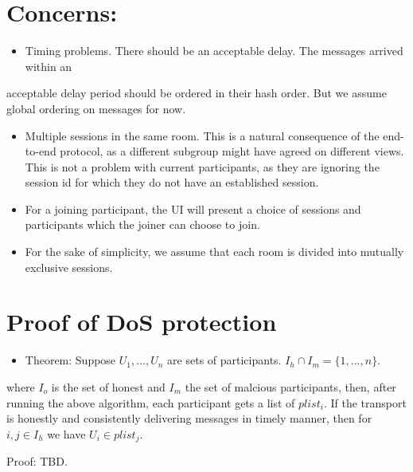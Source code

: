 \documentclass[11pt]{article}
\begin{document}
\section{Concerns:}
\label{sec-6}
\begin{itemize}
\item Timing problems. There should be an acceptable delay. The messages arrived within an
\end{itemize}
acceptable delay period should be ordered in their hash order. But we 
assume global ordering on messages for now.

\begin{itemize}
\item Multiple sessions in the same room. This is a natural consequence of the end-to-end protocol, as a different subgroup might have agreed on different views. This is not a problem with current participants, as they are ignoring the session id for which they do not have an established session.
\item For a joining participant, the UI will present a choice of sessions and participants which the joiner can choose to join.
\item For the sake of simplicity, we assume that each room is divided into mutually exclusive sessions.
\end{itemize}

\section{Proof of DoS protection}
\label{sec-7}
\begin{itemize}
\item Theorem: Suppose $U_1,...,U_n$ are sets of participants. $I_h \cap I_m = \{1,...,n\}$.
\end{itemize}
where $I_o$ is the set of honest and $I_m$ the set of malcious participants, then, after running the above algorithm, each participant gets a list of $plist_i$. If the transport is honestly and consistently delivering messages in timely manner, then for $i,j \in I_h$  
we have $U_i \in plist_j$.

Proof: TBD.
\end{document}
